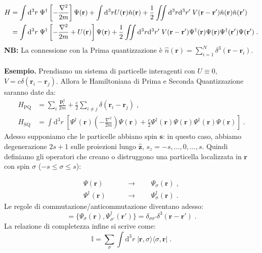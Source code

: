 \documentclass[10pt,a4paper]{report}
\theoremstyle{definition}
\numberwithin{equation}{section}
\newcommand{\diff}[1][]{\mathrm{d}#1}
\newcommand{\bra}{\langle}
\newcommand{\ket}{\rangle}
\begin{document}
\begin{align}
H &=\int\diff^3{r}\; \Psi^{\dagger}\left[-\frac{\nabla^2}{2m}\right]\Psi(\mathbf{r})+\int\diff^3{r} U(\mathbf{r})\hat{n}(\mathbf{r})+\frac{1}{2}\iint\diff^3{r}\diff^3{r'}\; V(\mathbf{r}-\mathbf{r}')\hat{n}(\mathbf{r})\hat{n}(\mathbf{r}') \notag \\
&= \int\diff^3{r}\;\Psi^{\dagger}\left[-\frac{\nabla^2}{2m}+U(\mathbf{r})\right]\Psi(\mathbf{r})+\frac{1}{2}\iint \diff^3{r}\diff^3{r'}\; V(\mathbf{r}-\mathbf{r}')\Psi^{\dagger}(\mathbf{r})\Psi(\mathbf{r})\Psi^{\dagger}(\mathbf{r}')\Psi(\mathbf{r}')\;.
\end{align}
\textbf{NB:} La connessione con la Prima quantizzazione è $\hat{n}(\mathbf{r})=\sum_{i=1}^N \delta^3(\mathbf{r}-\mathbf{r}_i)$. \\
\\
\textbf{Esempio.} Prendiamo un sistema di particelle interagenti con $U\equiv 0$, $V=c\delta(\mathbf{r}_i-\mathbf{r}_j)$.
Allora le Hamiltoniana di Prima e Seconda Quantizzazione saranno date da:
\begin{align*}
H_{\mathrm{PQ}} &= \sum_i\frac{\mathbf{p}_i^2}{2m}+\frac{c}{2}\sum_{i\ne j}\delta(\mathbf{r}_i-\mathbf{r}_j)\;, \\
H_{\mathrm{SQ}} &= \int\diff^3{r}\; \left[\Psi^{\dagger}(\mathbf{r})\left(-\frac{\nabla^2}{2m}\right)\Psi(\mathbf{r})+\frac{c}{2}\Psi^{\dagger}(\mathbf{r})\Psi(\mathbf{r})\Psi^{\dagger}(\mathbf{r})\Psi(\mathbf{r})\right]\;.
\end{align*}
Adesso supponiamo che le particelle abbiano spin $\mathbf{s}$: in questo caso, abbiamo degenerazione $2s+1$ sulle proiezioni lungo $\hat{\mathbf{z}}$, $s_z=-s,\ldots,0,\ldots,s$. Quindi definiamo gli operatori che creano o distruggono una particella localizzata in $\mathbf{r}$ con spin $\sigma$ ($-s\le\sigma\le s$):

\begin{align*}
\Psi(\mathbf{r})\qquad &\longrightarrow\qquad \Psi_{\sigma}(\mathbf{r})\;, \\
\Psi^{\dagger}(\mathbf{r})\qquad &\longrightarrow\qquad \Psi^{\dagger}_{\sigma}(\mathbf{r})\;.
\end{align*}
Le regole di commutazione/anticommutazione diventano adesso:
\begin{equation}
[\Psi_{\sigma}(\mathbf{r}),\Psi^{\dagger}_{\sigma'}(\mathbf{r}')]=\{\Psi_{\sigma}(\mathbf{r}),\Psi^{\dagger}_{\sigma'}(\mathbf{r}')\}=\delta_{\sigma\sigma'}\delta^3(\mathbf{r}-\mathbf{r}')\;.
\end{equation}
La relazione di completezza infine si scrive come:
\begin{equation}
\mathbb{I}=\sum_{\sigma}\int\diff^3{r}\;|\mathbf{r},\sigma\ket\bra\sigma,\mathbf{r}|\;.
\end{equation}
\end{document}
